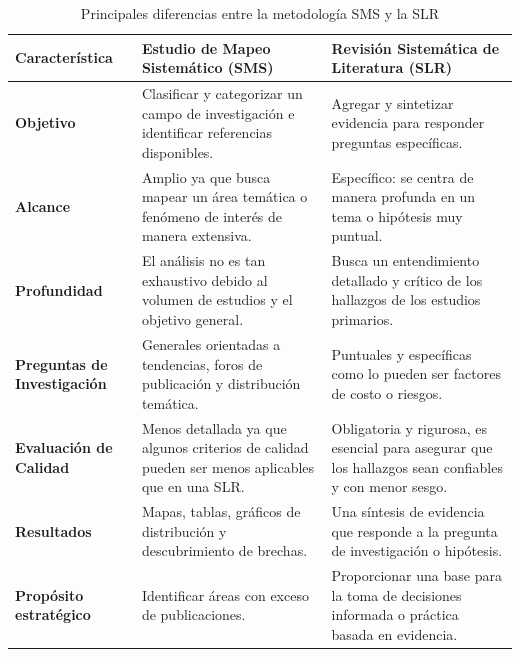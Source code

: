 \begin{table}[h!]
\centering
\caption{Principales diferencias entre la metodología SMS y la SLR}
\begin{tabular}{|p{2.1cm}|p{3.4cm}|p{3.4cm}|}
\hline
\textbf{Característica} & \textbf{Estudio de Mapeo Sistemático (SMS)} & \textbf{Revisión Sistemática de Literatura (SLR)} \\ \hline
\textbf{Objetivo} & Clasificar y categorizar un campo de investigación e identificar referencias disponibles. & Agregar y sintetizar evidencia para responder preguntas específicas. \\ \hline
\textbf{Alcance} & Amplio ya que busca mapear un área temática o fenómeno de interés de manera extensiva. & Específico: se centra de manera profunda en un tema o hipótesis muy puntual. \\ \hline
\textbf{Profundidad} & El análisis no es tan exhaustivo debido al volumen de estudios y el objetivo general. & Busca un entendimiento detallado y crítico de los hallazgos de los estudios primarios. \\ \hline
\textbf{Preguntas de Investigación} & Generales orientadas a tendencias, foros de publicación y distribución temática. & Puntuales y específicas como lo pueden ser factores de costo o riesgos. \\ \hline
\textbf{Evaluación de Calidad} &  Menos detallada ya que algunos criterios de calidad pueden ser menos aplicables que en una SLR. & Obligatoria y rigurosa, es esencial para asegurar que los hallazgos sean confiables y con menor sesgo. \\ \hline
\textbf{Resultados} & Mapas, tablas, gráficos de distribución y descubrimiento de brechas. & Una síntesis de evidencia que responde a la pregunta de investigación o hipótesis. \\ \hline
\textbf{Propósito estratégico} & Identificar áreas con exceso de publicaciones. & Proporcionar una base para la toma de decisiones informada o práctica basada en evidencia. \\ \hline
\end{tabular}
\end{table}